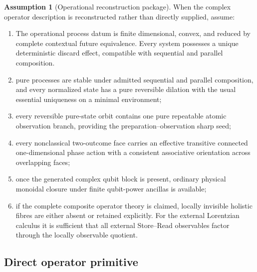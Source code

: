 \documentclass[11pt]{article}
\theoremstyle{definition}
\newtheorem{assumption}[theorem]{Assumption}
\theoremstyle{remark}
\begin{document}
\begin{assumption}[Operational reconstruction package]
\label{ass:operational-package}
When the complex operator description is reconstructed rather than directly
supplied, assume:
\begin{enumerate}[label=\textup{(O\arabic*)},leftmargin=3em]
\item The operational process datum is finite dimensional, convex, and reduced by complete contextual future equivalence. Every system possesses a unique deterministic discard effect, compatible with sequential and parallel composition.
\item pure processes are stable under admitted sequential and parallel
      composition, and every normalized state has a pure reversible dilation
      with the usual essential uniqueness on a minimal environment;
\item every reversible pure-state orbit contains one pure repeatable atomic
      observation branch, providing the preparation--observation sharp seed;
\item every nonclassical two-outcome face carries an effective transitive
      connected one-dimensional phase action with a consistent associative
      orientation across overlapping faces;
\item once the generated complex qubit block is present, ordinary physical
      monoidal closure under finite qubit-power ancillas is available;
\item if the complete composite operator theory is claimed, locally invisible
      holistic fibres are either absent or retained explicitly.  For the
      external Lorentzian calculus it is sufficient that all external
      Store--Read observables factor through the locally observable quotient.
\end{enumerate}
\end{assumption}

\subsection{Direct operator primitive}
\end{document}
